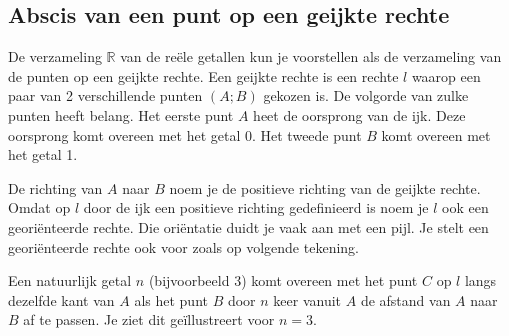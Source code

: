 \subsection{Abscis van een punt op een geijkte rechte}

De verzameling $\mathbb{R}$ van de re\"ele getallen kun je voorstellen als de verzameling van de punten op een geijkte rechte.
Een geijkte rechte is een rechte $l$ waarop een paar van 2 verschillende punten $(A;B)$ gekozen is.
De volgorde van zulke punten heeft belang.
Het eerste punt $A$ heet de oorsprong van de ijk.
Deze oorsprong komt overeen met het getal 0.
Het tweede punt $B$ komt overeen met het getal 1.



De richting van $A$ naar $B$ noem je de positieve richting van de geijkte rechte.
Omdat op $l$ door de ijk een positieve richting gedefinieerd is noem je $l$ ook een geori\"enteerde rechte.
Die ori\"entatie duidt je vaak aan met een pijl.
Je stelt een geori\"enteerde rechte ook voor zoals op volgende tekening.



Een natuurlijk getal $n$ (bijvoorbeeld 3) komt overeen met het punt $C$ op $l$ langs dezelfde kant van $A$ als het punt $B$ door $n$ keer vanuit $A$ de afstand van $A$ naar $B$ af te passen.
Je ziet dit ge\"illustreert voor $n=3$.




